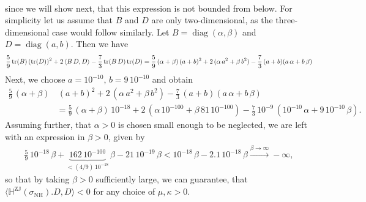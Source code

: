 \documentclass[10pt]{article}
\numberwithin{theoremCounter}{section}
\theoremstyle{plain}
\theoremstyle{definition}
\DeclareMathOperator{\diag}{diag}
\DeclareMathOperator{\tr}{tr}
\DeclareMathOperator{\ZJ}{ZJ}
\DeclareMathOperator{\NH}{NH}
\def\tr{\textnormal{tr}}
\def\H{\mathbb{H}}
\numberwithin{equation}{section}
\begin{document}
\begin{appendix}
\begin{equation}
\begin{alignedat}{2}
	\end{alignedat}
	\end{equation}
since we will show next, that this expression is not bounded from below. For simplicity let us assume that $B$ and $D$ are only two-dimensional, as the three-dimensional case would follow similarly. Let $B = \diag(\alpha, \beta)$ and $D = \diag(a,b)$. Then we have
	\begin{align}
	\frac59 \, \tr(B) \, (\tr(D))^2 + 2 \, \langle B \, D , D \rangle - \frac73 \, \tr(B \, D) \, \tr(D) = \frac59 \, (\alpha + \beta) \, (a+b)^2 + 2 \, (\alpha \, a^2 + \beta \, b^2) - \frac73 \, (a+b)(a \, \alpha + b \, \beta)
	\end{align}
Next, we choose $a = 10^{-10}, \, b = 9 \, 10^{-10}$ and obtain
	\begin{equation}
	\begin{alignedat}{2}
	\frac59 \, (\alpha + \beta) &\, (a+b)^2 + 2 \, (\alpha \, a^2 + \beta \, b^2) - \frac73 \, (a+b)(a \, \alpha + b \, \beta) \\
	&= \frac59 \, (\alpha + \beta) \, 10^{-18} + 2 \, (\alpha \, 10^{-100} + \beta \, 81 \, 10^{-100}) - \frac73 \, 10^{-9} \, (10^{-10} \, \alpha + 9 \, 10^{-10} \, \beta).
	\end{alignedat}
	\end{equation}
Assuming further, that $\alpha>0$ is chosen small enough to be neglected, we are left with an expression in $\beta > 0$, given by
	\begin{align}
	\frac59 \, 10^{-18} \, \beta + \underbrace{162 \, 10^{-100}}_{<(4/9) \, 10^{-18}} \, \beta - 21 \, 10^{-19} \, \beta < 10^{-18} \, \beta - 2.1 \, 10^{-18} \, \beta \xrightarrow{\beta \to \infty} -\infty,
	\end{align}
so that by taking $\beta>0$ sufficiently large, we can guarantee, that $\langle \H^{\ZJ}(\sigma_{\NH}).D,D \rangle < 0$ for any choice of $\mu, \kappa > 0$.


\end{appendix}
\end{document}
